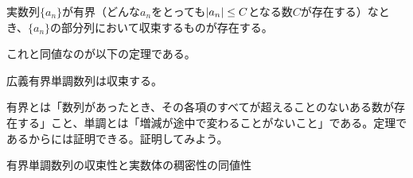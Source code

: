 \begin{defi}
    実数列$\{a_n\}$が有界（どんな$a_n$をとっても$\abso{a_n}\leq{}C$となる数$C$が存在する）なとき、$\{a_n\}$の部分列において収束するものが存在する。
\end{defi}

これと同値なのが以下の定理である。

\begin{theo}
    広義有界単調数列は収束する。
\end{theo}

有界とは「数列があったとき、その各項のすべてが超えることのないある数が存在する」こと、単調とは「増減が途中で変わることがないこと」である。定理であるからには証明できる。証明してみよう。
\begin{pr}
    有界単調数列の収束性と実数体の稠密性の同値性
\end{pr}